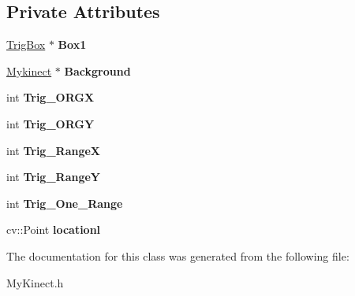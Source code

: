 \subsection*{Private Attributes}
\begin{DoxyCompactItemize}
\item 
\mbox{\label{class_kinect_1_1_trig_ae28e477303a3d36eb7bc46b2ac2ac1b8}} 
\hyperlink{class_kinect_1_1_trig_box}{Trig\+Box} $\ast$ {\bfseries Box1}
\item 
\mbox{\label{class_kinect_1_1_trig_a3eaf4a9ed95cb07f6eecb67c2588426e}} 
\hyperlink{class_kinect_1_1_mykinect}{Mykinect} $\ast$ {\bfseries Background}
\item 
\mbox{\label{class_kinect_1_1_trig_a8293916b77f6daeb2c821e4532cbbd79}} 
int {\bfseries Trig\+\_\+\+O\+R\+GX}
\item 
\mbox{\label{class_kinect_1_1_trig_a5ac80ec3a8f1d2aa9d70f0bda29bf07b}} 
int {\bfseries Trig\+\_\+\+O\+R\+GY}
\item 
\mbox{\label{class_kinect_1_1_trig_a21708af620395361c38c82c870b0c654}} 
int {\bfseries Trig\+\_\+\+RangeX}
\item 
\mbox{\label{class_kinect_1_1_trig_a9996fae20f160af5cf69bb093d3b0bed}} 
int {\bfseries Trig\+\_\+\+RangeY}
\item 
\mbox{\label{class_kinect_1_1_trig_a0a7b1a4e32b00fdeffb2240fbf662bd9}} 
int {\bfseries Trig\+\_\+\+One\+\_\+\+Range}
\item 
\mbox{\label{class_kinect_1_1_trig_a65b55ad7decae4323ac58ef2a1dbe801}} 
cv\+::\+Point {\bfseries locationl}
\end{DoxyCompactItemize}


The documentation for this class was generated from the following file\+:\begin{DoxyCompactItemize}
\item 
My\+Kinect.\+h\end{DoxyCompactItemize}
